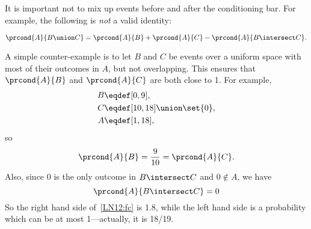 \iffalse
Namely,
\begin{align*}
\prcond{A \union B}{C}
    &= \frac{\pr{(A \union B) \intersect C}}{\pr{C}} \\[3pt]
    &= \frac{\pr{(A \intersect C) \union (B \intersect C)}}{\pr{C}} \\[3pt]
    &= \frac{\pr{A \intersect C} + \pr{B \intersect C}
             - \pr{A \intersect B \intersect C}}
            {\pr{C}} \\[3pt]
    &= \prcond{A}{C} + \prcond{B}{C} - \prcond{A \intersect B}{C}.
\end{align*}
\fi

It is important not to mix up events before and after the conditioning
bar.  For example, the following is \emph{not} a valid identity:
%
\begin{falseclm*}
\begin{equation}\label{LN12:fc}
\prcond{A}{B \union C} = \prcond{A}{B} + \prcond{A}{C} - \prcond{A}{B \intersect C}.
\end{equation}
\end{falseclm*}

A simple counter-example is to let $B$ and $C$ be events over a
uniform space with most of their outcomes in $A$, but not overlapping.
This ensures that $\prcond{A}{B}$ and $\prcond{A}{C}$ are both close
to 1.  For example,
\begin{align*}
B & \eqdef [0,9],\\
C & \eqdef [10,18] \union \set{0},\\
A & \eqdef [1,18],
\end{align*}
so
\[
\prcond{A}{B} = \frac{9}{10} = \prcond{A}{C}.
\]
Also, since 0 is the only outcome in $B \intersect C$ and $0 \notin
A$, we have
\[
\prcond{A}{B \intersect C} = 0
\]
So the right hand side of~\eqref{LN12:fc} is 1.8, while the left hand
side is a probability which can be at most 1---actually, it is 18/19.

\iffalse

A counterexample is shown in Figure~\ref{fig:15D2}.  In this case,
$\prcond{A}{B} = 1/2$, $\prcond{A}{C} = 1/2$, $\prcond{A}{B \intersect
  C} = 1$, and $\prcond{A}{B \union C} = 1/3$.  However, since
$1/3 \ne 1/2 + 1/2 - 1$, equation~\eqref{LN12:fc} does not hold.
%
\begin{figure}

\graphic{cx19}

\caption{A counterexample to equation~\eqref{LN12:fc}.  Event~$A$ is
  the dark-bordered rectangle, event~$B$ is the rectangle with
  vertical stripes, and event~$C$ is the rectangle with horizontal
  stripes.  $B \intersect C$ lies entirely within~$A$ while $B - C$
  and $C - B$ are entirely outside of~$A$.}

\label{fig:15D2}

\end{figure}
\fi



